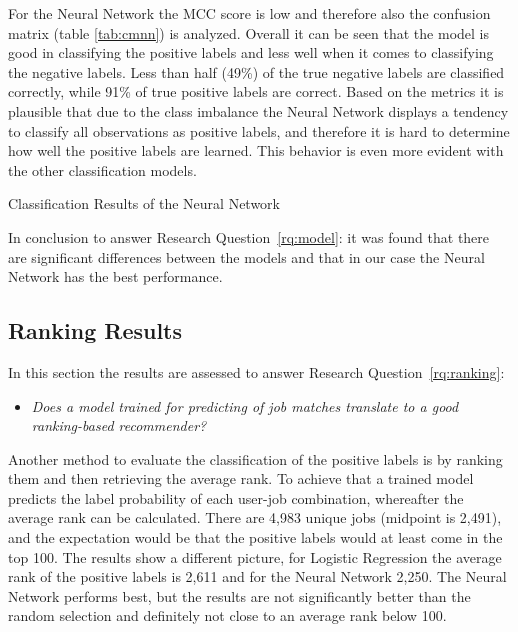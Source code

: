 For the Neural Network the MCC score is low and therefore also the confusion matrix (table \ref{tab:cmnn}) is analyzed.
Overall it can be seen that the model is good in classifying the positive labels and less well when it comes to classifying the negative labels.
Less than half (49\%) of the true negative labels are classified correctly, while 91\% of true positive labels are correct.
Based on the metrics it is plausible that due to the class imbalance the Neural Network displays a tendency to classify all observations as positive labels, and therefore it is hard to determine how well the positive labels are learned.
This behavior is even more evident with the other classification models.

\begin{table}[h]
\begin{footnotesize}

\end{footnotesize}
\caption{\label{tab:cmnn} \footnotesize{Classification Results of the Neural Network}}
\end{table}

In conclusion to answer Research Question~\ref{rq:model}: it was found that there are significant differences between the models and that in our case the Neural Network has the best performance.

\subsection{Ranking Results}
\label{ssec:rr}

In this section the results are assessed to answer Research Question~\ref{rq:ranking}:
\begin{itemize}
	\item[] \em Does a model trained for predicting of job matches translate to a good ranking-based recommender?
\end{itemize}

\noindent Another method to evaluate the classification of the positive labels is by ranking them and then retrieving the average rank.
To achieve that a trained model predicts the label probability of each user-job combination, whereafter the average rank can be calculated.
There are 4,983 unique jobs (midpoint is 2,491), and the expectation would be that the positive labels would at least come in the top 100. 
The results show a different picture, for Logistic Regression the average rank of the positive labels is 2,611 and for the Neural Network 2,250.
The Neural Network performs best, but the results are not significantly better than the random selection and definitely not close to an average rank below 100.


